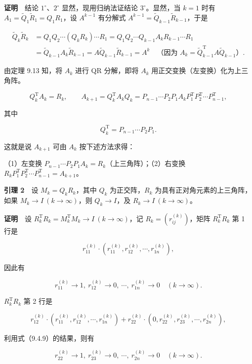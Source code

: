 \documentclass[
  10pt,
  fontset=fandol]{ctexart}
\begin{document}
\textbf{证明}　结论 \(1^\circ\)、\(2^\circ\) 显然，现用归纳法证结论 \(3^\circ\)。显然，当 \(k=1\) 时有 \(A_1=\widetilde Q_1\widetilde R_1=Q_1R_1\)，设 \(A^{k-1}\) 有分解式 \(A^{k-1}=\widetilde Q_{k-1}\widetilde R_{k-1}\)，于是

\[
\begin{aligned}
\widetilde Q_k\widetilde R_k
&=Q_1Q_2\cdots(Q_kR_k)\cdots R_1
=Q_1Q_2\cdots Q_{k-1}A_kR_{k-1}\cdots R_1\\
&=\widetilde Q_{k-1}A_k\widetilde R_{k-1}
=A\widetilde Q_{k-1}\widetilde R_{k-1}=A^k
\quad\text{（因为 }A_k=\widetilde Q_{k-1}^{\mathrm T}A\widetilde Q_{k-1}\text{）}.
\end{aligned}
\]

由定理 9.13 知，将 \(A_k\) 进行 QR 分解，即将 \(A_k\) 用正交变换（左变换）化为上三角阵。

\[
Q_k^{\mathrm T}A_k=R_k,\qquad
A_{k+1}=Q_k^{\mathrm T}A_kQ_k=P_{n-1}\cdots P_2P_1A_kP_1^{\mathrm T}P_2^{\mathrm T}\cdots P_{n-1}^{\mathrm T},
\]

其中

\[
Q_k^{\mathrm T}=P_{n-1}\cdots P_2P_1.
\]

这就是说 \(A_{k+1}\) 可由 \(A_k\) 按下述方法求得：

（1）左变换 \(P_{n-1}\cdots P_2P_1A_k=R_k\)（上三角阵）；（2）右变换 \(R_kP_1^{\mathrm T}P_2^{\mathrm T}\cdots P_{n-1}^{\mathrm T}=A_{k+1}\)。

\textbf{引理 2}　设 \(M_k=Q_kR_k\)，其中 \(Q_k\) 为正交阵，\(R_k\) 为具有正对角元素的上三角阵，如果 \(M_k\to I\ (k\to\infty)\)，则 \(Q_k\to I\)，及 \(R_k\to I\ (k\to\infty)\)。

\textbf{证明}　设 \(R_k^{\mathrm T}R_k=M_k^{\mathrm T}M_k\to I\ (k\to\infty)\)，记 \(R_k=(r_{ij}^{(k)})\)，矩阵 \(R_k^{\mathrm T}R_k\) 第 1 行是

\[
r_{11}^{(k)}\cdot(r_{11}^{(k)},r_{12}^{(k)},\cdots,r_{1n}^{(k)}),
\]

因此有

\[
r_{11}^{(k)}\to1,\ r_{12}^{(k)}\to0,\ \cdots,\ r_{1n}^{(k)}\to0\quad(k\to\infty).
\tag{9.4.9}
\]

\(R_k^{\mathrm T}R_k\) 第 2 行是

\[
r_{12}^{(k)}\cdot(r_{11}^{(k)},r_{12}^{(k)},\cdots,r_{1n}^{(k)})
+r_{22}^{(k)}\cdot(0,r_{22}^{(k)},r_{23}^{(k)},\cdots,r_{2n}^{(k)}),
\]

利用式（9.4.9）的结果，则有

\[
r_{22}^{(k)}\to1,\ r_{23}^{(k)}\to0,\ \cdots,\ r_{2n}^{(k)}\to0\quad(k\to\infty).
\tag{9.4.10}
\]
\end{document}
